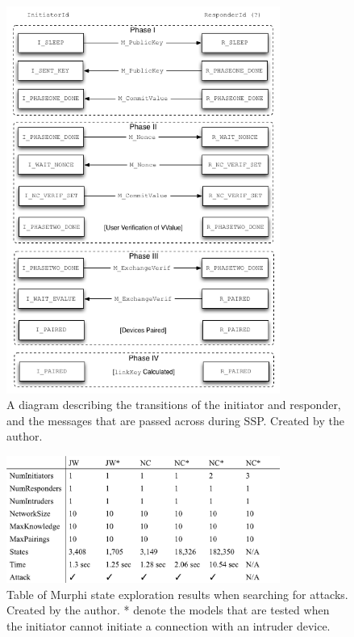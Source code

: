 \documentclass{acm_proc_article-sp}
\begin{document}
\begin{figure}
    \begin{center}
        \includegraphics[width=0.8\textwidth]{diagrams/transitions.png}
        \caption{A diagram describing the transitions of the initiator and responder, and the messages that are passed across during SSP. Created by the author.}
        \label{transitions}
    \end{center}
\end{figure}

\begin{figure}
    \begin{center}
        \includegraphics[width=0.8\textwidth]{diagrams/state_table.png}
        \caption{Table of Murphi state exploration results when searching for attacks. Created by the author. * denote the models that are tested when the initiator cannot initiate a connection with an intruder device.}
        \label{state_table}
    \end{center}
\end{figure}
\end{document}
